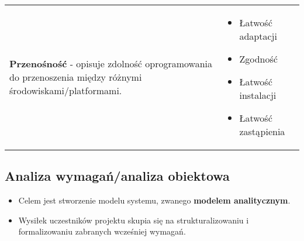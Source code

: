 \documentclass[../main.tex]{subfiles}
\begin{document}
\begin{table}[H]
\begin{center}
\begin{tabular}{  p{8cm} p{8cm} }
                \cmidrule(r){1-1}\cmidrule(l){2-2}

                \textbf{Przenośność} - opisuje zdolność oprogramowania do przenoszenia między różnymi środowiskami/platformami.
                &
                \begin{itemize}
                    \item Łatwość adaptacji
                    \item Zgodność
                    \item Łatwość instalacji
                    \item Łatwość zastąpienia
                \end{itemize}
                \\


            \end{tabular}
        \end{center}
    \end{table}

    \subsection{Analiza wymagań/analiza obiektowa}
    \begin{itemize}
        \item Celem jest stworzenie modelu systemu, zwanego \textbf{modelem analitycznym}.
        \item Wysiłek uczestników projektu skupia się na strukturalizowaniu i formalizowaniu zabranych
        wcześniej wymagań.
    \end{itemize}
\end{document}
